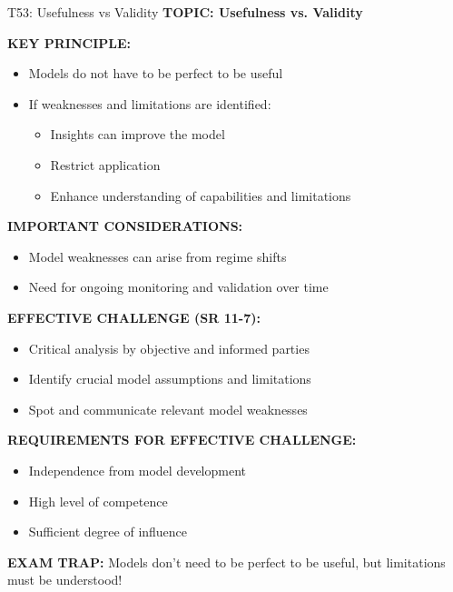 \documentclass[8pt]{beamer}
\begin{document}
	\begin{frame}{T53: Usefulness vs Validity}
		\fontsize{6.5}{7.5}\selectfont
		\textbf{TOPIC: Usefulness vs. Validity}
		
		\vspace{0.1cm}
		\textbf{KEY PRINCIPLE:}
		\begin{itemize}
			\item Models do not have to be perfect to be useful
			\item If weaknesses and limitations are identified:
			\begin{itemize}
				\item Insights can improve the model
				\item Restrict application
				\item Enhance understanding of capabilities and limitations
			\end{itemize}
		\end{itemize}
		
		\vspace{0.1cm}
		\textbf{IMPORTANT CONSIDERATIONS:}
		\begin{itemize}
			\item Model weaknesses can arise from regime shifts
			\item Need for ongoing monitoring and validation over time
		\end{itemize}
		
		\vspace{0.1cm}
		\textbf{EFFECTIVE CHALLENGE (SR 11-7):}
		\begin{itemize}
			\item Critical analysis by objective and informed parties
			\item Identify crucial model assumptions and limitations
			\item Spot and communicate relevant model weaknesses
		\end{itemize}
		
		\vspace{0.1cm}
		\textbf{REQUIREMENTS FOR EFFECTIVE CHALLENGE:}
		\begin{itemize}
			\item Independence from model development
			\item High level of competence
			\item Sufficient degree of influence
		\end{itemize}
		
		\textcolor{myred}{\textbf{EXAM TRAP:}} Models don't need to be perfect to be \textcolor{myblue}{useful, but limitations must be understood}!
	\end{frame}
	
\end{document}
